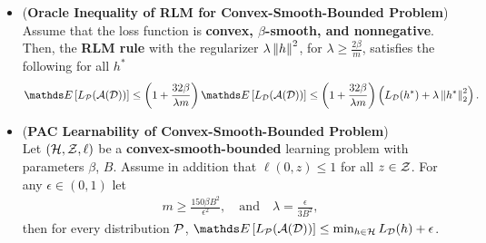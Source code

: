 \documentclass[11pt]{article}
\begin{document}
\begin{itemize}
\item \begin{corollary}(\textbf{Oracle Inequality of RLM for Convex-Smooth-Bounded Problem}) \citep{shalev2014understanding}\\
Assume that the loss function is \textbf{convex, $\beta$-smooth, and nonnegative}. Then, the \textbf{RLM rule} with the regularizer $\lambda\left\|h\right\|_{}^2$, for $\lambda \ge \frac{2\beta}{m}$, satisfies the following for all $h^{*}$
\begin{align}
\E{}{L_{\cP}(\cA(\cD))} \le \paren{1+ \frac{32 \beta}{\lambda m}}\E{}{L_{\cD}(\cA(\cD))} \le \paren{1+ \frac{32 \beta}{\lambda m}}\paren{L_{\cD}(h^{*}) + \lambda \norm{h^{*}}{2}^2}.  \label{def: convex_smooth_learnable_oracle}
\end{align}
\end{corollary}

\item \begin{corollary}(\textbf{PAC Learnability of Convex-Smooth-Bounded Problem}) \citep{shalev2014understanding}\\
Let  $({\mathcal H}, {\mathcal Z}, \ell)$ be a \textbf{convex-smooth-bounded} learning problem with parameters $\beta$, $B$. Assume in addition that $\ell(0,z) \le 1$ for all $z \in {\mathcal Z}$. For any $\epsilon \in (0,1)$ let 
\begin{align*}
m \ge \frac{150 \beta B^2}{\epsilon^2}, \quad \text{and} \quad \lambda = \frac{\epsilon}{3B^2},
\end{align*} then for every distribution ${\mathcal P}$, $\E{}{L_{\cP}(\cA(\cD))} \le \min_{h \in \cH}L_{\cD}(h) + \epsilon$.
\end{corollary}
\end{itemize}

\newpage


\end{document}
